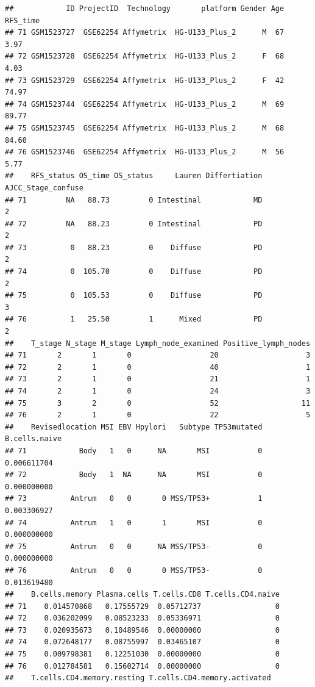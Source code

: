 \documentclass[
  12pt,
]{book}
\begin{document}
\begin{verbatim}
##            ID ProjectID  Technology       platform Gender Age RFS_time
## 71 GSM1523727  GSE62254 Affymetrix  HG-U133_Plus_2      M  67     3.97
## 72 GSM1523728  GSE62254 Affymetrix  HG-U133_Plus_2      F  68     4.03
## 73 GSM1523729  GSE62254 Affymetrix  HG-U133_Plus_2      F  42    74.97
## 74 GSM1523744  GSE62254 Affymetrix  HG-U133_Plus_2      M  69    89.77
## 75 GSM1523745  GSE62254 Affymetrix  HG-U133_Plus_2      M  68    84.60
## 76 GSM1523746  GSE62254 Affymetrix  HG-U133_Plus_2      M  56     5.77
##    RFS_status OS_time OS_status     Lauren Differtiation AJCC_Stage_confuse
## 71         NA   88.73         0 Intestinal            MD                  2
## 72         NA   88.23         0 Intestinal            PD                  2
## 73          0   88.23         0    Diffuse            PD                  2
## 74          0  105.70         0    Diffuse            PD                  2
## 75          0  105.53         0    Diffuse            PD                  3
## 76          1   25.50         1      Mixed            PD                  2
##    T_stage N_stage M_stage Lymph_node_examined Positive_lymph_nodes
## 71       2       1       0                  20                    3
## 72       2       1       0                  40                    1
## 73       2       1       0                  21                    1
## 74       2       1       0                  24                    3
## 75       3       2       0                  52                   11
## 76       2       1       0                  22                    5
##    Revisedlocation MSI EBV Hpylori   Subtype TP53mutated B.cells.naive
## 71            Body   1   0      NA       MSI           0   0.006611704
## 72            Body   1  NA      NA       MSI           0   0.000000000
## 73          Antrum   0   0       0 MSS/TP53+           1   0.003306927
## 74          Antrum   1   0       1       MSI           0   0.000000000
## 75          Antrum   0   0      NA MSS/TP53-           0   0.000000000
## 76          Antrum   0   0       0 MSS/TP53-           0   0.013619480
##    B.cells.memory Plasma.cells T.cells.CD8 T.cells.CD4.naive
## 71    0.014570868   0.17555729  0.05712737                 0
## 72    0.036202099   0.08523233  0.05336971                 0
## 73    0.020935673   0.10489546  0.00000000                 0
## 74    0.072648177   0.08755997  0.03465107                 0
## 75    0.009798381   0.12251030  0.00000000                 0
## 76    0.012784581   0.15602714  0.00000000                 0
##    T.cells.CD4.memory.resting T.cells.CD4.memory.activated

\end{verbatim}
\end{document}
